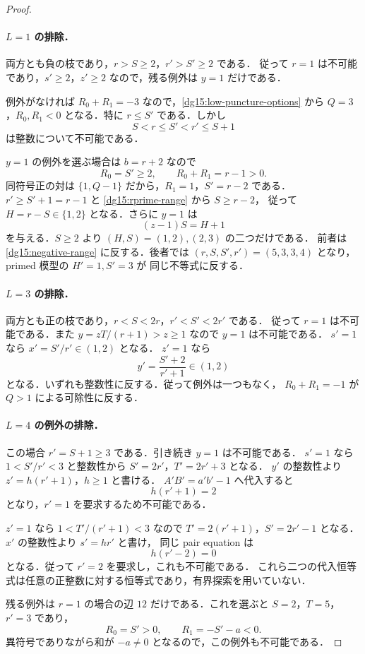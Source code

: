 \begin{proof}
\paragraph{$L=1$ の排除．}
両方とも負の枝であり，$r>S\geq2$，$r'>S'\geq2$ である．
従って $r=1$ は不可能であり，$s'\geq2$，$z'\geq2$ なので，残る例外は $y=1$ だけである．

例外がなければ $R_0+R_1=-3$ なので，\eqref{dg15:low-puncture-options} から
$Q=3$，$R_0,R_1<0$ となる．特に $r\leq S'$ である．しかし
\[
 S<r\leq S'<r'\leq S+1
\]
は整数について不可能である．

$y=1$ の例外を選ぶ場合は $b=r+2$ なので
\[
 R_0=S'\geq2,\qquad R_0+R_1=r-1>0.
\]
同符号正の対は $\{1,Q-1\}$ だから，$R_1=1$，$S'=r-2$ である．
$r'\geq S'+1=r-1$ と \eqref{dg15:rprime-range} から $S\geq r-2$，
従って $H=r-S\in\{1,2\}$ となる．さらに $y=1$ は
\[
 (z-1)S=H+1
\]
を与える．$S\geq2$ より $(H,S)=(1,2),(2,3)$ の二つだけである．
前者は \eqref{dg15:negative-range} に反する．後者では
$(r,S,S',r')=(5,3,3,4)$ となり，primed 模型の $H'=1,S'=3$ が
同じ不等式に反する．

\paragraph{$L=3$ の排除．}
両方とも正の枝であり，$r<S<2r$，$r'<S'<2r'$ である．
従って $r=1$ は不可能である．また $y=zT/(r+1)>z\geq1$ なので $y=1$ は不可能である．
$s'=1$ なら $x'=S'/r'\in(1,2)$ となる．
$z'=1$ なら
\[
 y'=\frac{S'+2}{r'+1}\in(1,2)
\]
となる．いずれも整数性に反する．従って例外は一つもなく，
$R_0+R_1=-1$ が $Q>1$ による可除性に反する．

\paragraph{$L=4$ の例外の排除．}
この場合 $r'=S+1\geq3$ である．引き続き $y=1$ は不可能である．
$s'=1$ なら $1<S'/r'<3$ と整数性から $S'=2r'$，$T'=2r'+3$ となる．
$y'$ の整数性より $z'=h(r'+1)$，$h\geq1$ と書ける．
$A'B'=a'b'-1$ へ代入すると
\[
 h(r'+1)=2
\]
となり，$r'=1$ を要求するため不可能である．

$z'=1$ なら $1<T'/(r'+1)<3$ なので
$T'=2(r'+1)$，$S'=2r'-1$ となる．$x'$ の整数性より $s'=h r'$ と書け，
同じ pair equation は
\[
 h(r'-2)=0
\]
となる．従って $r'=2$ を要求し，これも不可能である．
これら二つの代入恒等式は任意の正整数に対する恒等式であり，有界探索を用いていない．

残る例外は $r=1$ の場合の辺 $12$ だけである．これを選ぶと
$S=2$，$T=5$，$r'=3$ であり，
\[
 R_0=S'>0,\qquad R_1=-S'-a<0.
\]
異符号でありながら和が $-a\ne0$ となるので，この例外も不可能である．


\end{proof}
